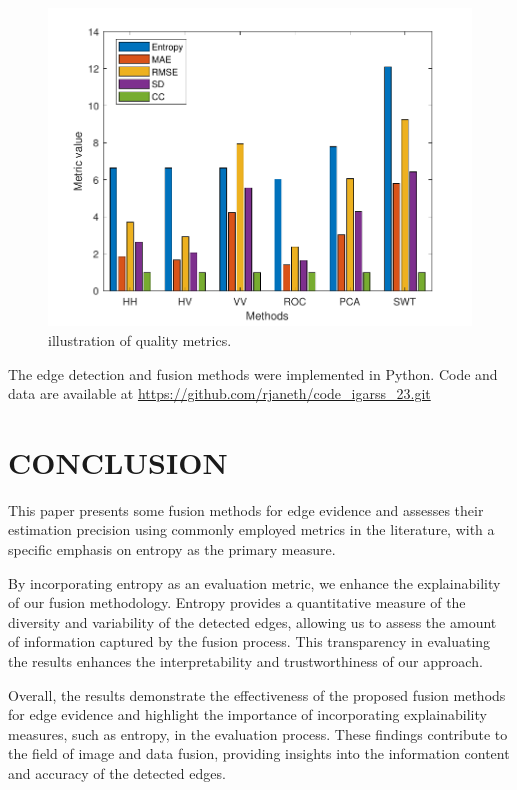 \documentclass{article}
\begin{document}
\begin{figure}[hbt] 
	\includegraphics[scale=0.55]{figures/metricas.pdf}\vspace{-3.5mm} 
	\caption{illustration of quality metrics.}\vspace{-0.3cm}
	\label{F5}
\end{figure}%

The edge detection and fusion methods were implemented in Python. 
Code and data are available at \url{ https://github.com/rjaneth/code_igarss_23.git}

\section{CONCLUSION}

This paper presents some fusion methods for edge evidence and assesses their estimation precision using commonly employed metrics in the literature, with a specific emphasis on entropy as the primary measure.

By incorporating entropy as an evaluation metric, we enhance the explainability of our fusion methodology. Entropy provides a quantitative measure of the diversity and variability of the detected edges, allowing us to assess the amount of information captured by the fusion process. This transparency in evaluating the results enhances the interpretability and trustworthiness of our approach.

Overall, the results demonstrate the effectiveness of the proposed fusion methods for edge evidence and highlight the importance of incorporating explainability measures, such as entropy, in the evaluation process. These findings contribute to the field of image and data fusion, providing insights into the information content and accuracy of the detected edges.


%
%

%


\end{document}
